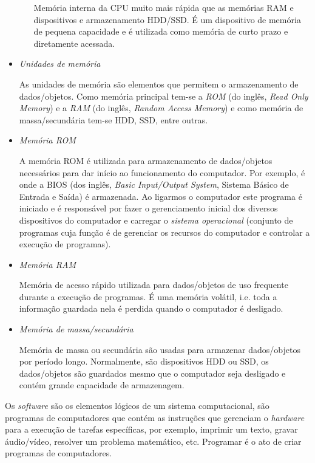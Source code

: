 \begin{itemize}
\begin{itemize}
    Memória interna da CPU muito mais rápida que as memórias RAM e dispositivos e armazenamento HDD/SSD. É um dispositivo de memória de pequena capacidade e é utilizada como memória de curto prazo e diretamente acessada.
  \end{itemize}

\item \emph{Unidades de memória}

  As unidades de memória são elementos que permitem o armazenamento de dados/objetos. Como memória principal tem-se a \emph{ROM} (do inglês, {\it Read Only Memory}) e a \emph{RAM} (do inglês, {\it Random Access Memory}) e como memória de massa/secundária tem-se HDD, SSD, entre outras.

\item \emph{Memória ROM}

  A memória ROM é utilizada para armazenamento de dados/objetos necessários para dar início ao funcionamento do computador. Por exemplo, é onde a BIOS (dos inglês, {\it Basic Input/Output System}, Sistema Básico de Entrada e Saída) é armazenada. Ao ligarmos o computador este programa é iniciado e é responsável por fazer o gerenciamento inicial dos diversos dispositivos do computador e carregar o \emph{sistema operacional} (conjunto de programas cuja função é de gerenciar os recursos do computador e controlar a execução de programas).

\item \emph{Memória RAM}

  Memória de acesso rápido utilizada para dados/objetos de uso frequente durante a execução de programas. É uma memória volátil, i.e. toda a informação guardada nela é perdida quando o computador é desligado.

\item \emph{Memória de massa/secundária}

  Memória de massa ou secundária são usadas para armazenar dados/objetos por período longo. Normalmente, são dispositivos HDD ou SSD, os dados/objetos são guardados mesmo que o computador seja desligado e contém grande capacidade de armazenagem.   
\end{itemize}

Os \emph{software} são os elementos lógicos de um sistema computacional, são programas de computadores que contém as instruções que gerenciam o \emph{hardware} para a execução de tarefas específicas, por exemplo, imprimir um texto, gravar áudio/vídeo, resolver um problema matemático, etc. Programar é o ato de criar programas de computadores.

